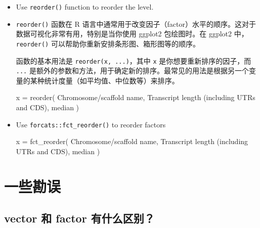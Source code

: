 \documentclass[
]{article}
\newenvironment{Shaded}{}{}
\newcommand{\AttributeTok}[1]{\textcolor[rgb]{0.49,0.56,0.16}{#1}}
\newcommand{\FunctionTok}[1]{\textcolor[rgb]{0.02,0.16,0.49}{#1}}
\newcommand{\NormalTok}[1]{#1}
\newcommand{\OtherTok}[1]{\textcolor[rgb]{0.00,0.44,0.13}{#1}}
\newcommand{\StringTok}[1]{\textcolor[rgb]{0.25,0.44,0.63}{#1}}
\begin{document}
\begin{itemize}
\item
  Use \texttt{reorder()} function to reorder the level.
\item
  \texttt{reorder()} 函数在 R
  语言中通常用于改变因子（factor）水平的顺序。这对于数据可视化非常有用，特别是当你使用
  ggplot2 包绘图时。在 ggplot2 中，\texttt{reorder()}
  可以帮助你重新安排条形图、箱形图等的顺序。

  函数的基本用法是 \texttt{reorder(x,\ ...)}，其中 \texttt{x}
  是你想要重新排序的因子，而 \texttt{...}
  是额外的参数和方法，用于确定新的排序。最常见的用法是根据另一个变量的某种统计度量（如平均值、中位数等）来排序。

\begin{Shaded}
\begin{Highlighting}[]
\NormalTok{x }\OtherTok{=} \FunctionTok{reorder}\NormalTok{( }
  \StringTok{\textasciigrave{}}\AttributeTok{Chromosome/scaffold name}\StringTok{\textasciigrave{}}\NormalTok{,}
  \StringTok{\textasciigrave{}}\AttributeTok{Transcript length (including UTRs and CDS)}\StringTok{\textasciigrave{}}\NormalTok{,}
\NormalTok{  median}
\NormalTok{)}
\end{Highlighting}
\end{Shaded}
\item
  Use \texttt{forcats::fct\_reorder()} to reorder factors

\begin{Shaded}
\begin{Highlighting}[]
\NormalTok{x }\OtherTok{=} \FunctionTok{fct\_reorder}\NormalTok{( }
  \StringTok{\textasciigrave{}}\AttributeTok{Chromosome/scaffold name}\StringTok{\textasciigrave{}}\NormalTok{,}
  \StringTok{\textasciigrave{}}\AttributeTok{Transcript length (including UTRs and CDS)}\StringTok{\textasciigrave{}}\NormalTok{,}
\NormalTok{  median }
\NormalTok{)}
\end{Highlighting}
\end{Shaded}
\end{itemize}

\newpage
\hypertarget{ux4e00ux4e9bux52d8ux8bef}{%
\section{一些勘误}\label{ux4e00ux4e9bux52d8ux8bef}}

\hypertarget{vector-ux548c-factor-ux6709ux4ec0ux4e48ux533aux522b}{%
\subsection{vector 和 factor
有什么区别？}\label{vector-ux548c-factor-ux6709ux4ec0ux4e48ux533aux522b}}
\end{document}
